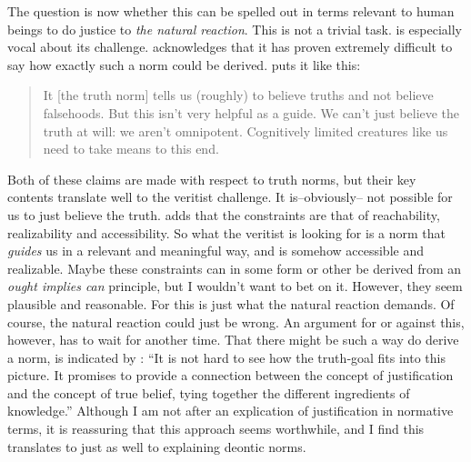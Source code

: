\documentclass[12pt,numbers=noenddot]{scrartcl}
\begin{document}
The question is now whether this can be spelled out in terms relevant to human beings to do justice to \emph{the natural reaction}. This is not a trivial task. \textcite[Ch. 4]{Gibbons2013-GIBTNO} is especially vocal about its challenge.
\noindent \textcite[Ch. 4]{Boghossian2008-BOGCAJ} acknowledges that it has proven extremely difficult to say how exactly such a norm could be derived. \textcite[16]{Greenberg2016-GREITN} puts it like this:
\begin{quote}
It [the truth norm] tells us (roughly) to believe truths and not believe falsehoods. But this isn’t very helpful as a guide. We can’t just believe the truth at will: we aren’t omnipotent. Cognitively limited creatures like us need to take means to this end.
\end{quote}
Both of these claims are made with respect to truth norms, but their key contents translate well to the veritist challenge. It is–obviously– not possible for us to just believe the truth. \textcite[62]{Goldman2002-GOLTUO-2} adds that the constraints are that of reachability, realizability and accessibility.
So what the veritist is looking for is a norm that \emph{guides} us in a relevant and meaningful way, and is somehow accessible and realizable. Maybe these constraints can in some form or other be derived from an \emph{ought implies can} principle, but I wouldn't want to bet on it. However, they seem plausible and reasonable. For this is just what the natural reaction demands. Of course, the natural reaction could just be wrong. An argument for or against this, however, has to wait for another time. That there might be such a way do derive a norm, is indicated by \textcite[154]{David2001-DAVTAT-7}: “It is not hard to see how the truth‐goal fits into this picture. It promises to provide a connection between the concept of justification and the concept of true belief, tying together the different ingredients of knowledge.” Although I am not after an explication of justification in normative terms, it is reassuring that this approach seems worthwhile, and I find this translates to just as well to explaining deontic norms.
\end{document}
